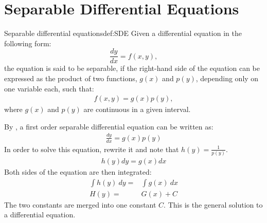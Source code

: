 \section{Separable Differential Equations}\label{SepDiff}
\begin{definition}{Separable differential equations}{def:SDE}
Given a differential equation in the following form: 
$$\frac{dy}{dx} = f(x,y),$$
the equation is said to be separable, if the right-hand side of the equation can be expressed as the product of two functions, $g(x)$ and $p(y)$, depending only on one variable each, such that:
\begin{align}
f(x,y)=g(x)p(y),
\end{align}
where $g(x)$ and $p(y)$ are continuous in a given interval.
\end{definition}
\noindent
By , a first order separable differential equation can be written as:
\begin{align}
	\frac{dy}{dx}=g(x)p(y)
\end{align}
In order to solve this equation, rewrite it and note that $h(y) = \frac{1}{p(y)}$.
\begin{align}
	h(y)dy=g(x)dx
\end{align}
Both sides of the equation are then integrated:
\begin{align}
\int h(y)\ dy =&\int g(x)\ dx   \\
H(y)=&G(x)+C \label{SDEG}
\end{align}
The two constants are merged into one constant $C$. This is the general solution to a differential equation. \cite{diffandcomplex}
